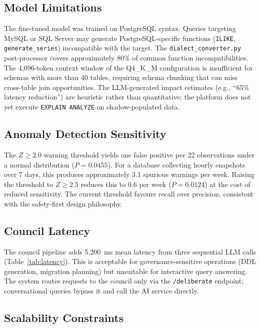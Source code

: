 \documentclass[conference]{IEEEtran}
\begin{document}
\subsection{Model Limitations}

The fine-tuned model was trained on PostgreSQL syntax. Queries targeting
MySQL or SQL Server may generate PostgreSQL-specific functions
(\texttt{ILIKE}, \texttt{generate\_series}) incompatible with the target.
The \texttt{dialect\_converter.py} post-processor covers approximately
80\% of common function incompatibilities. The 4,096-token context window
of the Q4\_K\_M configuration is insufficient for schemas with more than
40 tables, requiring schema chunking that can miss cross-table join
opportunities. The LLM-generated impact estimates (e.g., ``65\% latency
reduction'') are heuristic rather than quantitative; the platform does not
yet execute \texttt{EXPLAIN ANALYZE} on shadow-populated data.

\subsection{Anomaly Detection Sensitivity}

The $Z \geq 2.0$ warning threshold yields one false positive per 22
observations under a normal distribution ($P = 0.0455$). For a database
collecting hourly snapshots over 7 days, this produces approximately 3.1
spurious warnings per week. Raising the threshold to $Z \geq 2.5$ reduces
this to 0.6 per week ($P = 0.0124$) at the cost of reduced sensitivity.
The current threshold favours recall over precision, consistent with the
safety-first design philosophy.

\subsection{Council Latency}

The council pipeline adds 5,200~ms mean latency from three sequential LLM
calls (Table~\ref{tab:latency}). This is acceptable for
governance-sensitive operations (DDL generation, migration planning) but
unsuitable for interactive query answering. The system routes requests to
the council only via the \texttt{/deliberate} endpoint; conversational
queries bypass it and call the AI service directly.

\subsection{Scalability Constraints}
\end{document}
